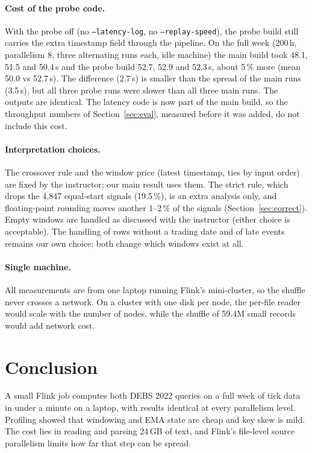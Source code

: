 \documentclass[sigconf,nonacm]{acmart}
\begin{document}
\paragraph{Cost of the probe code.} With the probe off (no
\texttt{--latency-log}, no \texttt{--replay-speed}), the probe build still
carries the extra timestamp field through the pipeline. On the full week
(200\,h, parallelism 8, three alternating runs each, idle machine) the main
build took 48.1, 51.5 and 50.4\,s and the probe build 52.7, 52.9 and 52.3\,s,
about 5\,\% more (mean 50.0 vs 52.7\,s). The difference (2.7\,s) is smaller
than the spread of the main runs (3.5\,s), but all three probe runs were slower
than all three main runs. The outputs are identical. The latency code is now
part of the main build, so the throughput numbers of Section~\ref{sec:eval},
measured before it was added, do not include this cost.

\paragraph{Interpretation choices.} The crossover rule and the window price
(latest timestamp, ties by input order) are fixed by the instructor; our main
result uses them. The strict rule, which drops the 4,847 equal-start signals
(19.5\,\%), is an extra analysis only, and floating-point rounding moves
another 1--2\,\% of the signals (Section~\ref{sec:correct}). Empty windows
are handled as discussed with the instructor (either choice is acceptable).
The handling of rows without a trading date and of late events remains our own
choice; both change which windows exist at all.

\paragraph{Single machine.} All measurements are from one laptop running
Flink's mini-cluster, so the shuffle never crosses a network. On a cluster with
one disk per node, the per-file reader would scale with the number of nodes,
while the shuffle of 59.4M small records would add network cost.

\section{Conclusion}
A small Flink job computes both DEBS 2022 queries on a full week of tick data
in under a minute on a laptop, with results identical at every parallelism
level. Profiling showed that windowing and EMA state are cheap and key skew is
mild. The cost lies in reading and parsing 24\,GB of text, and Flink's
file-level source parallelism limits how far that step can be spread.

\begin{acks}
\end{acks}



\end{document}
